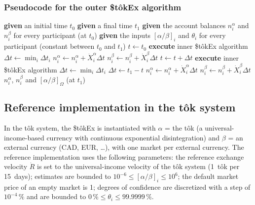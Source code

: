 \documentclass[letterpaper]{article}
\newcommand{\priceAB}{\left[\alpha / \beta\right]}
\newcommand{\StokEx}{\$t\^{o}kEx}
\newcommand{\tok}{t\^{o}k}
\begin{document}
\subsubsection{Pseudocode for the outer \StokEx{} algorithm}

\begin{algorithmic}[1]
    \STATE \textbf{given} an initial time $t_0$
    \STATE \textbf{given} a final time $t_1$
    \STATE \textbf{given} the account balances $n_i^\alpha$ and $n_i^\beta$ for every participant (at $t_0$)
    \STATE \textbf{given} the inputs $\priceAB_i$ and $\theta_i$ for every participant (constant between $t_0$ and $t_1$)
    \STATE $t \gets t_0$
    \STATE \textbf{execute} inner \StokEx{} algorithm
    \STATE $\Delta t \gets \min_i \Delta t_i$
            \STATE $n_i^\alpha \gets n_i^\alpha + \dot{X}_i^\alpha \Delta t$
            \STATE $n_i^\beta \gets n_i^\beta + \dot{X}_i^\beta \Delta t$
        \ENDFOR
        \STATE $t \gets t + \Delta t$
        \STATE \textbf{execute} inner \StokEx{} algorithm
        \STATE $\Delta t \gets \min_i \Delta t_i$
    \ENDWHILE
    \STATE $\Delta t \gets t_1 - t$
        \STATE $n_i^\alpha \gets n_i^\alpha + \dot{X}_i^\alpha \Delta t$
        \STATE $n_i^\beta \gets n_i^\beta + \dot{X}_i^\beta \Delta t$
    \ENDFOR
    \RETURN $n_i^\alpha$, $n_i^\beta$ and $\priceAB_\Omega$ (at $t_1$)
\end{algorithmic}

\subsection{Reference implementation in the \tok{} system}\label{secReferenceImplementation}

In the \tok{} system, the \StokEx{} is instantiated with $\alpha$ = the \tok{} (a universal-income-based currency with continuous exponential disintegration) and $\beta$ = an external currency (CAD, EUR, \ldots), with one market per external currency. The reference implementation uses the following parameters: the reference exchange velocity $\dot{R}$ is set to the universal-income velocity of the \tok{} system (1~\tok{} per 15~days); estimates are bounded to $10^{-6} \leq \priceAB_i \leq 10^{6}$; the default market price of an empty market is 1; degrees of confidence are discretized with a step of $10^{-4}\,\%$ and are bounded to $0\,\% \leq \theta_i \leq 99.9999\,\%$.
\end{document}
